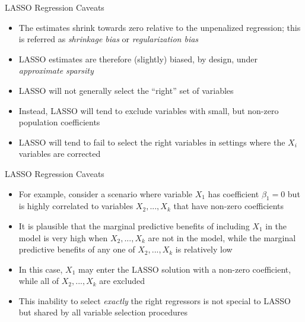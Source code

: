 \documentclass[aspectratio=1610,12pt,xcolor=dvipsnames]{beamer}
\begin{document}
\begin{frame}{LASSO Regression Caveats}

\begin{itemize}
    \item The estimates shrink towards zero relative to the unpenalized regression; this is referred as \textit{shrinkage bias} or \textit{regularization bias}
    \item LASSO estimates are therefore (slightly) biased, by design, under \textit{approximate sparsity} \pause
    \item LASSO will not generally select the ``right'' set of variables
    \item Instead, LASSO will tend to exclude variables with small, but non-zero population coefficients
    \item LASSO will tend to fail to select the right variables in settings where the $X_i$ variables are corrected
\end{itemize}
\end{frame}

\begin{frame}{LASSO Regression Caveats}

\begin{itemize}
    \item For example, consider a scenario where variable $X_1$ has coefficient $\beta_1=0$ but is highly correlated to variables $X_2,...,X_k$ that have non-zero coefficients
    \item It is plausible that the marginal predictive benefits of including $X_1$ in the model is very high when $X_2,...,X_k$ are not in the model, while the marginal predictive benefits of any one of $X_2,...,X_k$ is relatively low
    \item In this case, $X_1$ may enter the LASSO solution with a non-zero coefficient, while all of $X_2,...,X_k$ are excluded
    \item This inability to select \textit{exactly} the right regressors is not special to LASSO but shared by all variable selection procedures
\end{itemize}
\end{frame}
\end{document}

